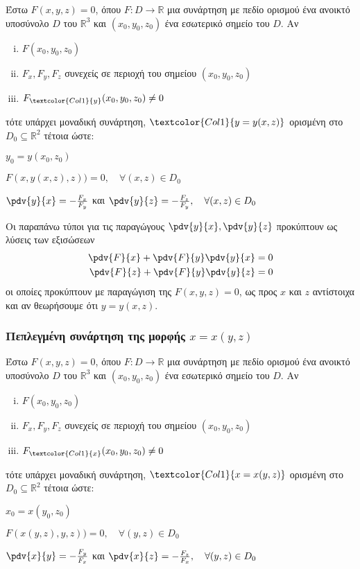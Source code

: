 Έστω $ F(x,y,z) = 0 $, όπου $F\colon D \to \mathbb{R}$ μια συνάρτηση με πεδίο ορισμού 
ένα ανοικτό υποσύνολο $ D $ του $ \mathbb{R}^{3}  $ και $ (x_0,y_0,z_0) $ ένα 
εσωτερικό σημείο του $ D $. Αν
\begin{enumerate}[(i)]
  \item $ F(x_0,y_0,z_0) $
  \item $ F_x, F_y, F_z $ συνεχείς σε περιοχή του σημείου $ (x_0,y_0,z_0) $
  \item $ F_{\textcolor{Col1}{y}}(x_0,y_0,z_0) \neq 0 $
\end{enumerate}
τότε υπάρχει μοναδική συνάρτηση, $ \textcolor{Col1}{y=y(x,z)} $ ορισμένη στο 
$ D_0 \subseteq \mathbb{R}^{2} $ τέτοια ώστε:
\begin{myitemize}
  \item $ y_0 = y(x_0,z_0) $
  \item $ F(x,y(x,z),z)) = 0,  \quad \forall (x,z) \in  D_0 $
  \item $ \pdv{y}{x} = - \frac{F_x}{F_y} $ και $ \pdv{y}{z} = - \frac{F_z}{F_y}, 
    \quad \forall (x,z) \in D_0$
\end{myitemize}

\begin{rem}
  Οι παραπάνω τύποι για τις παραγώγους $ \pdv{y}{x}, \pdv{y}{z} $ προκύπτουν 
  ως λύσεις των εξισώσεων  
  \begin{align*}	
    \pdv{F}{x} + \pdv{F}{y}\pdv{y}{x} &= 0 \\
    \pdv{F}{z} + \pdv{F}{y}\pdv{y}{z} &= 0 
  \end{align*}
  οι οποίες προκύπτουν με παραγώγιση της $ F(x,y,z) = 0 $, ως προς $x$ και $z$ 
  αντίστοιχα και  αν θεωρήσουμε ότι $ y=y(x,z) $.
\end{rem}

\subsubsection{Πεπλεγμένη συνάρτηση της μορφής \ensuremath{x=x(y,z)}}

Έστω $ F(x,y,z) = 0 $, όπου $F\colon D \to \mathbb{R}$ μια συνάρτηση με πεδίο ορισμού 
ένα ανοικτό υποσύνολο $ D $ του $ \mathbb{R}^{3}  $ και $ (x_0,y_0,z_0) $ ένα 
εσωτερικό σημείο του $ D $. Αν
\begin{enumerate}[(i)]
  \item $ F(x_0,y_0,z_0) $
  \item $ F_x, F_y, F_z $ συνεχείς σε περιοχή του σημείου $ (x_0,y_0,z_0) $
  \item $ F_{\textcolor{Col1}{x}}(x_0,y_0,z_0) \neq 0 $
\end{enumerate}
τότε υπάρχει μοναδική συνάρτηση, $ \textcolor{Col1}{x=x(y,z)} $ ορισμένη στο 
$ D_0 \subseteq \mathbb{R}^{2} $ τέτοια ώστε:
\begin{myitemize}
  \item $ x_0 = x(y_0,z_0) $
  \item $ F(x(y,z),y,z)) = 0,  \quad \forall (y,z) \in  D_0 $
  \item $ \pdv{x}{y} = - \frac{F_y}{F_x} $ και $ \pdv{x}{z} = - \frac{F_z}{F_x}, 
    \quad \forall (y,z) \in D_0$
\end{myitemize}

